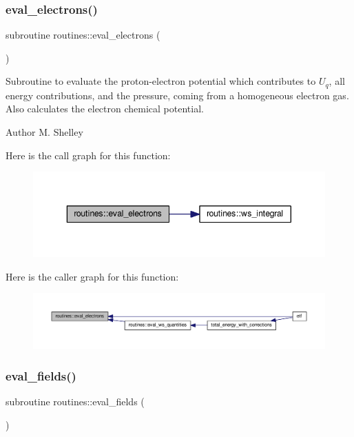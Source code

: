 \subsubsection{\texorpdfstring{eval\+\_\+electrons()}{eval\_electrons()}}
{\footnotesize\ttfamily subroutine routines\+::eval\+\_\+electrons (\begin{DoxyParamCaption}{ }\end{DoxyParamCaption})}



Subroutine to evaluate the proton-\/electron potential which contributes to $U_q$, all energy contributions, and the pressure, coming from a homogeneous electron gas. Also calculates the electron chemical potential. 

\begin{DoxyAuthor}{Author}
M. Shelley 
\end{DoxyAuthor}
Here is the call graph for this function\+:
\nopagebreak
\begin{figure}[H]
\begin{center}
\leavevmode
\includegraphics[width=343pt]{namespaceroutines_a0b55cc503c7168299be63556e2602bd0_cgraph}
\end{center}
\end{figure}
Here is the caller graph for this function\+:
\nopagebreak
\begin{figure}[H]
\begin{center}
\leavevmode
\includegraphics[width=350pt]{namespaceroutines_a0b55cc503c7168299be63556e2602bd0_icgraph}
\end{center}
\end{figure}
\mbox{\label{namespaceroutines_aa995449a9eb9c404dbd756bdbea180a2}} 
\subsubsection{\texorpdfstring{eval\+\_\+fields()}{eval\_fields()}}
{\footnotesize\ttfamily subroutine routines\+::eval\+\_\+fields (\begin{DoxyParamCaption}{ }\end{DoxyParamCaption})}



